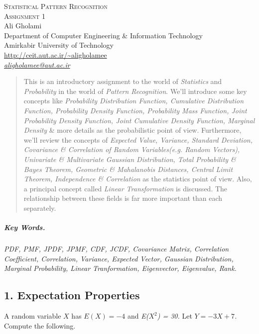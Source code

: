 \documentclass[12pt]{article}
\numberwithin{equation}{section}
\numberwithin{table}{section}
\numberwithin{figure}{section}
\begin{document}

\begin{center}
\textsc{\Large Statistical Pattern Recognition} \\[2pt]
	\textsc{\large Assignment 1}\\
	\vspace{0.5cm}
  Ali Gholami \\[6pt]
  Department of Computer Engineering \& Information Technology\\
  Amirkabir University of Technology  \\[6pt]
  \def\UrlFont{\em}
  \url{http://ceit.aut.ac.ir/~aligholamee}\\
    \href{mailto:aligholamee@aut.ac.ir}{\textit{aligholamee@aut.ac.ir}}
\end{center}

\begin{abstract}
This is an introductory assignment to the world of \textit{Statistics} and \textit{Probability} in the world of \textit{Pattern Recognition}. We'll introduce some key concepts like \textit{Probability Distribution Function, Cumulative Distribution Function, Probability Density Function, Probability Mass Function, Joint Probability Density Function, Joint Cumulative Density Function, Marginal Density} \& more details as the probabilistic point of view. Furthermore, we'll review the concepts of \textit{Expected Value, Variance, Standard Deviation, Covariance \& Correlation of Random Variables(e.g. Random Vectors), Univariate \& Multivariate Gaussian Distribution, Total Probability \& Bayes Theorem, Geometric \& Mahalanobis Distances, Central Limit Theorem, Independence \& Correlation} as the statistics point of view. Also, a principal concept called \textit{Linear Transformation} is discussed. The relationship between these fields is far more important than each separately.
\end{abstract}

\subparagraph{Key Words.} \textit{PDF, PMF, JPDF, JPMF, CDF, JCDF, Covariance Matrix, Correlation Coefficient, Correlation, Variance, Expected Vector, Gaussian Distribution, Marginal Probability, Linear Tranformation, Eigenvector, Eigenvalue, Rank.}

\subsection{1. Expectation Properties}

A random variable \textit{$X$} has \textit{$E(X) = -4$} and \textit{E($X^2$) = 30.} Let \textit{$Y = -3X + 7$.} Compute the following.
\end{document}
